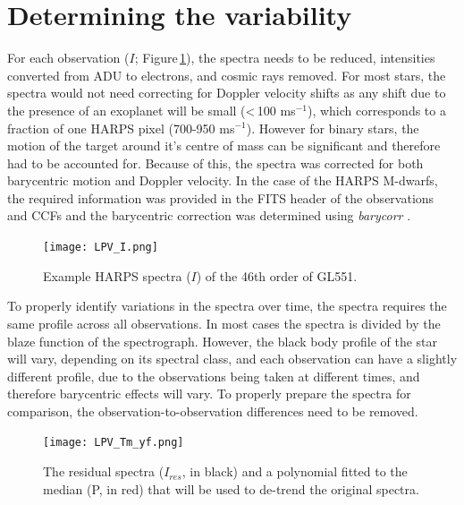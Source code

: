 \section{Determining the variability}
\label{secISV}
For each observation ($I$; Figure\,\ref{figLPV_I}), the spectra needs to be reduced, intensities converted from ADU to electrons, and cosmic rays removed. For most stars, the spectra would not need correcting for Doppler velocity shifts as any shift due to the presence of an exoplanet will be small (\textless\,100 ms$^{-1}$), which corresponds to a fraction of one HARPS pixel (700-950 ms$^{-1}$). However for binary stars, the motion of the target around it's centre of mass can be significant and therefore had to be accounted for. Because of this, the spectra was corrected for both barycentric motion and Doppler velocity. In the case of the HARPS M-dwarfs, the required information was provided in the FITS header of the observations and CCFs and the barycentric correction was determined using \textit{barycorr} \citep{2014Wright}.\\

\begin{figure}
	\centering
	\captionsetup{width=.8\textwidth}
    \texttt{[image: LPV\_I.png]}
    \caption{Example HARPS spectra ($I$) of the 46th order of GL551.}
    \label{figLPV_I}
\end{figure}

To properly identify variations in the spectra over time, the spectra requires the same profile across all observations. In most cases the spectra is divided by the blaze function of the spectrograph. However, the black body profile of the star will vary, depending on its spectral class, and each observation can have a slightly different profile, due to the observations being taken at different times, and therefore barycentric effects will vary. To properly prepare the spectra for comparison, the observation-to-observation differences need to be removed.\\

\begin{figure}
    \centering
    \captionsetup{width=.8\textwidth}
    \texttt{[image: LPV\_Tm\_yf.png]}
    \caption{The residual spectra ($I_{res}$, in black) and a polynomial fitted to the median (P, in red) that will be used to de-trend the original spectra.}
    \label{figLPVres+poly}
\end{figure}

